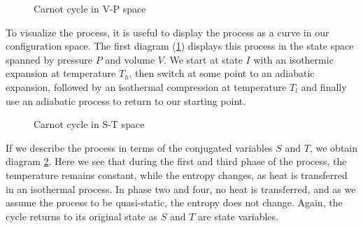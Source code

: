 \documentclass[a4paper, draft]{article}
\theoremstyle{own}
\theoremstyle{remark}
\begin{document}
\begin{figure}[h]
	\centering
	\caption{Carnot cycle in V-P space}\label{fig:carnotpv}
\end{figure}

To visualize the process, it is useful to display the process as a curve in our configuration space. The first diagram (\ref{fig:carnotpv}) displays this process in the state space spanned by pressure $P$ and volume $V$. We start at state $I$ with an isothermic expansion at temperature $T_h$, then switch at some point to an adiabatic expansion, followed by an isothermal compression at temperature $T_l$ and finally use an adiabatic process to return to our starting point. 

\begin{figure}[h]
	\centering
	\caption{Carnot cycle in S-T space}\label{fig:carnotst}
\end{figure}


If we describe the process in terms of the conjugated variables $S$ and $T$, we obtain diagram \ref{fig:carnotst}. Here we see that during the first and third phase of the process, the temperature remains constant, while the entropy changes, as heat is transferred in an isothermal process. In phase two and four, no heat is transferred, and as we assume the process to be quasi-static, the entropy does not change. Again, the cycle returns to its original state as $S$ and $T$ are state variables.
\end{document}
